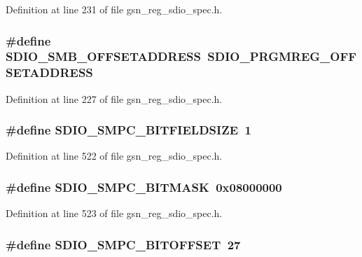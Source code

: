 Definition at line 231 of file gsn\_\-reg\_\-sdio\_\-spec.h.

\hypertarget{a00571_a0c0f39e2e7828046fff76a257acaf8f8}{
\subsubsection[{SDIO\_\-SMB\_\-OFFSETADDRESS}]{\setlength{\rightskip}{0pt plus 5cm}\#define SDIO\_\-SMB\_\-OFFSETADDRESS~SDIO\_\-PRGMREG\_\-OFFSETADDRESS}}
\label{a00571_a0c0f39e2e7828046fff76a257acaf8f8}


Definition at line 227 of file gsn\_\-reg\_\-sdio\_\-spec.h.

\hypertarget{a00571_a062d1709d40ff53b6fa7672dd6e12832}{
\subsubsection[{SDIO\_\-SMPC\_\-BITFIELDSIZE}]{\setlength{\rightskip}{0pt plus 5cm}\#define SDIO\_\-SMPC\_\-BITFIELDSIZE~1}}
\label{a00571_a062d1709d40ff53b6fa7672dd6e12832}


Definition at line 522 of file gsn\_\-reg\_\-sdio\_\-spec.h.

\hypertarget{a00571_a0ec6bbeb04710d979fb4166046b9a3df}{
\subsubsection[{SDIO\_\-SMPC\_\-BITMASK}]{\setlength{\rightskip}{0pt plus 5cm}\#define SDIO\_\-SMPC\_\-BITMASK~0x08000000}}
\label{a00571_a0ec6bbeb04710d979fb4166046b9a3df}


Definition at line 523 of file gsn\_\-reg\_\-sdio\_\-spec.h.

\hypertarget{a00571_a022fb2e23208737a54425a001d5b173a}{
\subsubsection[{SDIO\_\-SMPC\_\-BITOFFSET}]{\setlength{\rightskip}{0pt plus 5cm}\#define SDIO\_\-SMPC\_\-BITOFFSET~27}}
\label{a00571_a022fb2e23208737a54425a001d5b173a}


